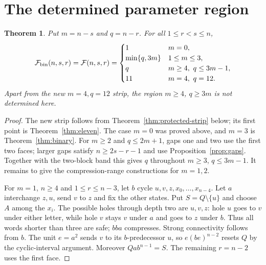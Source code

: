 \documentclass[10pt]{article}
\newtheorem{theorem}{Theorem}
\newcommand{\Max}{\mathcal F}
\begin{document}
\section{The determined parameter region}
\begin{theorem}\label{thm:region}
Put $m=n-s$ and $q=n-r$. For all $1\le r<s\le n$,
\[
 \Max_{\rm bin}(n,s,r)=\Max(n,s,r)=
 \begin{cases}
 1&m=0,\\
 \min\{q,3m\}&1\le m\le3,\\
 q&m\ge4,\ q\le3m-1,\\
 11&m=4,\ q=12.
 \end{cases}
\]
Apart from the new $m=4,q=12$ strip, the region $m\ge4$, $q\ge3m$ is not determined here.
\end{theorem}
\begin{proof}
The new strip follows from Theorem~\ref{thm:protected-strip} below; its first point is Theorem~\ref{thm:eleven}. The case $m=0$ was proved above, and $m=3$ is Theorem~\ref{thm:binary}.
For $m\ge2$ and $q\le2m+1$, gaps one and two use the first two faces;
larger gaps satisfy $n\ge2s-r-1$ and use Proposition~\ref{prop:gaps}.
Together with the two-block band this gives $q$ throughout $m\ge3$, $q\le3m-1$.
It remains to give the compression-range constructions for $m=1,2$.

For $m=1$, $n\ge4$ and $1\le r\le n-3$, let $b$ cycle
$u,v,z,x_0,\ldots,x_{n-4}$.
Let $a$ interchange $z,u$, send $v$ to $z$ and fix the other states.
Put $S=Q\setminus\{u\}$ and choose $A$ among the $x_i$.
The possible holes through depth two are $u,v,z$:
hole $u$ goes to $v$ under either letter, while hole $v$ stays $v$ under $a$
and goes to $z$ under $b$. Thus all words shorter than three are safe;
$bba$ compresses. Strong connectivity follows from $b$.
The unit $e=a^2$ sends $v$ to its $b$-predecessor $u$, so
$e(be)^{n-2}$ resets $Q$ by the cyclic-interval argument.
Moreover $Qab^{n-1}=S$. The remaining $r=n-2$ uses the first face.


\end{proof}
\end{document}
